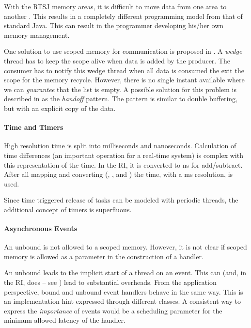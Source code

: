 With the RTSJ memory areas, it is difficult to move data from one
area to another \cite{Niessner03}. This results in a completely
different programming model from that of standard Java. This can
result in the programmer developing his/her own memory management.

One solution to use scoped memory for communication is proposed in
\cite{conf/isorc/PizloFHV04}. A \emph{wedge} thread has to keep the
scope alive when data is added by the producer. The consumer has to
notify this wedge thread when all data is consumed the exit the scope
for the memory recycle. However, there is no single instant available
where we can \emph{guarantee} that the list is empty. A possible
solution for this problem is described in
\cite{conf/isorc/PizloFHV04} as the \emph{handoff} pattern. The
pattern is similar to double buffering, but with an explicit copy of
the data.


\paragraph{Time and Timers }

High resolution time is split into milliseconds and nanoseconds.
Calculation of time differences (an important operation for a
real-time system) is complex with this representation of the time.
In the RI, it is converted to ns for add/subtract. After all mapping
and converting (, ,
 and ) the
 time, with a ms resolution, is
used.

Since time triggered release of tasks can be modeled with periodic
threads, the additional concept of timers is superfluous.

\paragraph{Asynchronous Events}

An unbound  is not allowed to 
a scoped memory. However, it is not clear if scoped memory is
allowed as a parameter in the construction of a handler.

An unbound  leads to the implicit start of a
thread on an event. This can (and, in the RI, does -- see
\cite{701668}) lead to substantial overheads. From the application
perspective, bound and unbound event handlers behave in the same
way. This is an implementation hint expressed through different
classes. A consistent way to express the \textit{importance} of
events would be a scheduling parameter for the minimum allowed
latency of the handler.

